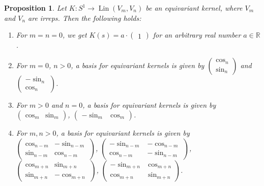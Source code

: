 \documentclass[12pt, a4paper]{article}
\theoremstyle{plain}
\newtheorem{pro}{Proposition}[section]
\theoremstyle{definition}
\theoremstyle{remark}
\newcommand{\R}{\mathds{R}}
\DeclareMathOperator{\lin}{Lin}
\begin{document}
\begin{pro}
Let $K: S^1 \to \lin(V_m, V_n)$ be an equivariant kernel, where $V_m$ and $V_n$ are irreps. Then the following holds:

\begin{enumerate}
\item For $m = n = 0$, we get $K(s) = a \cdot \begin{pmatrix} 1 \end{pmatrix}$ for an arbitrary real number $a \in \R$.
\item For $m = 0$, $n > 0$, a basis for equivariant kernels is given by $\begin{pmatrix} \cos_n \\ \sin_n \end{pmatrix}$ and $\begin{pmatrix}- \sin_n \\ \cos_n \end{pmatrix}$.
\item For $m > 0$ and $n = 0$, a basis for equivariant kernels is given by $\begin{pmatrix} \cos_m & \sin_m \end{pmatrix}$, $\begin{pmatrix}  - \sin_m & \cos_m \end{pmatrix}$.
\item For $m, n > 0$, a basis for equivariant kernels is given by $\begin{pmatrix} \cos_{n-m} & - \sin_{n-m} \\ \sin_{n-m} & \cos_{n-m} \end{pmatrix}$, $\begin{pmatrix} - \sin_{n-m} & -\cos_{n-m} \\ \cos_{n-m} & -\sin_{n-m} \end{pmatrix}$, $\begin{pmatrix} \cos_{m+n} & \sin_{m+n} \\ \sin_{m+n} & - \cos_{m+n}\end{pmatrix}$, $\begin{pmatrix} -\sin_{m+n} & \cos_{m+n} \\ \cos_{m+n} & \sin_{m+n} \end{pmatrix}$.
\end{enumerate}
\end{pro}
\end{document}
